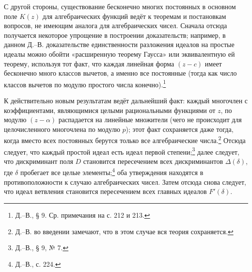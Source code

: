 \documentclass[11pt]{article}
\begin{document}
С другой стороны, существование бесконечно многих постоянных в основном поле \(K(z)\) для алгебраических функций ведёт к теоремам и постановкам вопросов, не имеющим аналога для алгебраических чисел. Сначала отсюда получается некоторое упрощение в построении доказательств; например, в данном Д.--В. доказательстве единственности разложения идеалов на простые идеалы можно обойти «расширенную теорему Гаусса» или эквивалентную ей теорему, используя тот факт, что каждая линейная форма \((z-c)\) имеет бесконечно много классов вычетов, а именно все постоянные (тогда как число классов вычетов по модулю простого числа конечно).\footnote{Д.--В., § 9. Ср. примечания на с. 212 и 213.}

К действительно новым результатам ведёт дальнейший факт: каждый многочлен с коэффициентами, являющимися целыми рациональными функциями от \(z\), по модулю \((z-\alpha)\) распадается на линейные множители (чего не происходит для целочисленного многочлена по модулю \(p\)); этот факт сохраняется даже тогда, когда вместо всех постоянных берутся только все алгебраические числа.\footnote{Д.--В. во введении замечают, что в этом случае вся теория сохраняется.} Отсюда следует, что каждый простой идеал есть идеал первой степени;\footnote{Д.--В., § 9, № 7.} далее следует, что дискриминант поля \(D\) становится пересечением всех дискриминантов \(\Delta(\delta)\), где \(\delta\) пробегает все целые элементы;\footnote{Д.--В., с. 224.} оба утверждения находятся в противоположности к случаю алгебраических чисел. Затем отсюда снова следует, что идеал ветвления становится пересечением всех главных идеалов \(F'(\delta)\).
\end{document}
